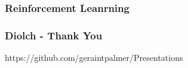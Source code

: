 \documentclass{beamer}
\begin{document}

\begin{frame}
    \frametitle{Reinforcement Leanrning}
\end{frame}

\begin{frame}
    \frametitle{Diolch - Thank You}
    https://github.com/geraintpalmer/Presentations
\end{frame}
\end{document}
